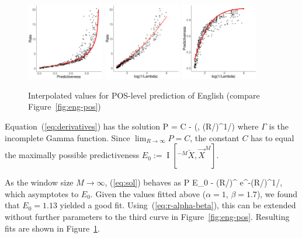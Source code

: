 \documentclass[entropy,article,submit,moreauthors,pdftex,10pt,a4paper]{Definitions/mdpi}
\newcommand{\finitefuture}{\overrightarrow{X}^{M}}
\newcommand{\finitepast}{^{-M}\overleftarrow{X}}%
\let\oldequation\equation
\let\oldendequation\endequation
\renewenvironment{equation}
  {\linenomathNonumbers\oldequation}
  {\oldendequation\endlinenomath}
\begin{document}
\begin{figure}
\includegraphics[width=0.3\textwidth]{code/figures/english-info-fitted.pdf}
\includegraphics[width=0.3\textwidth]{code/figures/english-logbeta-mem-fitted.pdf}
	\includegraphics[width=0.3\textwidth]{code/figures/english-nlogbeta-ee-fitted.pdf}
	\caption{Interpolated values for POS-level prediction of English (compare Figure~\ref{fig:eng-pos}) }\label{fig:eng-pos-fitted}
\end{figure}


Equation~(\ref{eq:derivatives}) has the solution
\begin{equation}\label{eq:sol}
	P = C - \alpha\beta \cdot \Gamma\left(\beta, (R/\alpha)^{1/\beta}\right)
\end{equation}
where $\Gamma$ is the incomplete Gamma function.
Since $\lim_{R \rightarrow \infty} P = C$, the constant $C$ has to equal the maximally possible predictiveness $E_0 := \operatorname{I}[\finitepast, \finitefuture]$.

As the window size $M \rightarrow \infty$, (\ref{eq:sol}) behaves as
\begin{equation}
	P \approx E_0 - \alpha\beta \cdot (R/\alpha)^{} e^{-(R/\alpha)^{1/\beta}},
\end{equation}
which asymptotes to $E_0$.
Given the values fitted above ($\alpha=1$, $\beta=1.7$), we found that $E_0 = 1.13$ yielded a good fit.
Using~(\ref{eq:r-alpha-beta}), this can be extended without further parameters to the third curve in Figure~\ref{fig:eng-pos}.
Resulting fits are shown in Figure~\ref{fig:eng-pos-fitted}.
\end{document}
